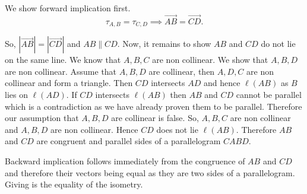 \begin{solution}
  We show forward implication first.
  \[
    \tau_{A,B} = \tau_{C,D} \implies \overrightarrow{AB} = \overrightarrow{CD}
  .\] 

  So, \( | \overrightarrow{AB} | = |  \overrightarrow{CD} | \) and \( AB \parallel CD \).
  Now, it remains to show \( AB \) and \( CD \) do not lie on the same line.
  We know that \( A,B,C \) are non collinear. We show that \( A,B,D \) are non collinear.
 Assume that \( A,B,D  \) are collinear, then \( A, D, C \) are non collinear and form a triangle. Then \( CD \) intersects \( AD \)
 and hence  \( \ell(AB) \) as \( B \) lies on \( \ell(AD) \). If \( CD \) intersects \( \ell(AB) \) then \( AB \) and \( CD \)
 cannot be parallel which is a contradiction as we have already proven them to be parallel.
 Therefore our assumption that \( A,B,D \) are collinear is false. So, \( A,B,C \) are non collinear and \( A,B,D \)
 are non collinear. Hence \( CD \) does not lie \( \ell(AB) \). Therefore \( AB \) and \( CD \) are congruent and parallel sides 
 of a parallelogram \( CABD \).

 Backward implication follows immediately from the congruence of \( AB \) and \( CD \) and therefore their vectors being equal 
 as they are two sides of a parallelogram. Giving is the equality of the isometry.

 \end{solution}
